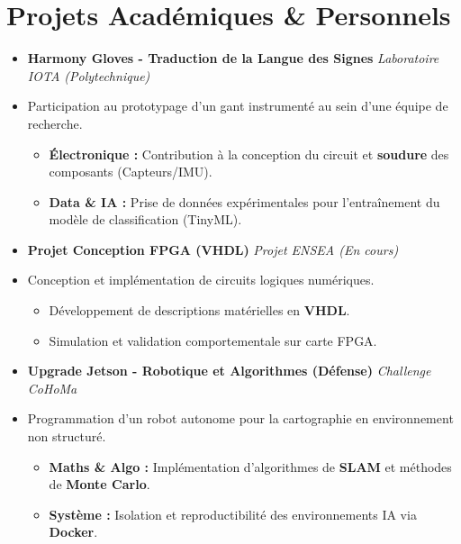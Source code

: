 \documentclass[a4paper,11pt]{article}
\begin{document}
\section{Projets Académiques \& Personnels}
\begin{itemize}[leftmargin=*, label={}]
\item \textbf{Harmony Gloves - Traduction de la Langue des Signes} \hfill \textit{Laboratoire IOTA (Polytechnique)}
\vspace{-2pt}
\item \small{Participation au prototypage d'un gant instrumenté au sein d'une équipe de recherche.}
    \begin{itemize}[leftmargin=0.4cm, nosep, label=\tiny$\bullet$]
        \item \small{\textbf{Électronique :} Contribution à la conception du circuit et \textbf{soudure} des composants (Capteurs/IMU).}
        \item \small{\textbf{Data \& IA :} Prise de données expérimentales pour l'entraînement du modèle de classification (TinyML).}
    \end{itemize}
    \vspace{1pt}

\item \textbf{Projet Conception FPGA (VHDL)} \hfill \textit{Projet ENSEA (En cours)}
\vspace{-2pt}
\item \small{Conception et implémentation de circuits logiques numériques.}
    \begin{itemize}[leftmargin=0.4cm, nosep, label=\tiny$\bullet$]
        \item \small{Développement de descriptions matérielles en \textbf{VHDL}.}
        \item \small{Simulation et validation comportementale sur carte FPGA.}
    \end{itemize}
    \vspace{1pt}

\item \textbf{Upgrade Jetson - Robotique et Algorithmes (Défense)} \hfill \textit{Challenge CoHoMa}
\vspace{-2pt}
\item \small{Programmation d'un robot autonome pour la cartographie en environnement non structuré.}
    \begin{itemize}[leftmargin=0.4cm, nosep, label=\tiny$\bullet$]
        \item \small{\textbf{Maths \& Algo :} Implémentation d'algorithmes de \textbf{SLAM} et méthodes de \textbf{Monte Carlo}.}
        \item \small{\textbf{Système :} Isolation et reproductibilité des environnements IA via \textbf{Docker}.}
    \end{itemize}
    \vspace{1pt}




\end{itemize}
\end{document}
